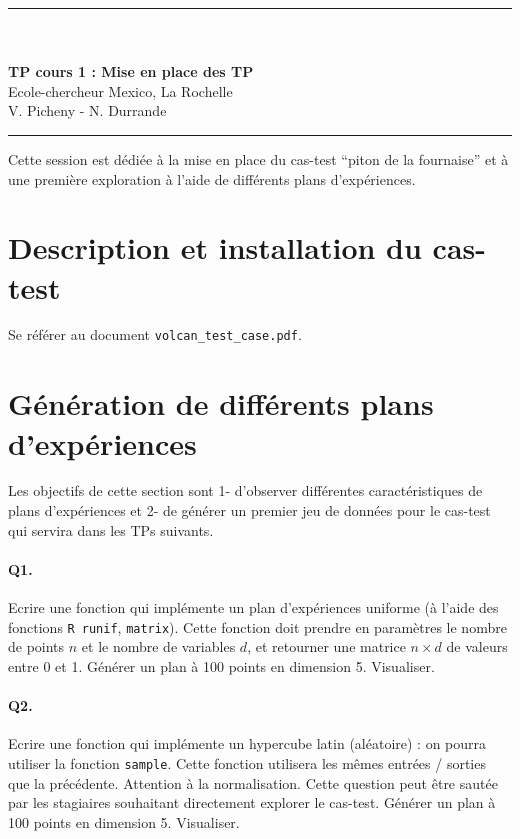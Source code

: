 \documentclass[12pt]{scrartcl}
\newcommand{\R}{\texttt{R}}
\begin{document}
\begin{center}
	\rule{\textwidth}{1pt}
	\\ \ \\
	{\LARGE \textbf{TP cours 1 : Mise en place des TP}}\\
	\vspace{3mm}
	{\large Ecole-chercheur Mexico, La Rochelle \\ \vspace{3mm}}
	{\normalsize V. Picheny - N. Durrande}\\
	\vspace{3mm}
	\rule{\textwidth}{1pt}
	\vspace{5mm}
\end{center}
Cette session est dédiée à la mise en place du cas-test ``piton de la fournaise'' et à une première exploration à l'aide de différents plans d'expériences.

\section{Description et installation du cas-test}
Se référer au document \texttt{volcan\_test\_case.pdf}.

\section{Génération de différents plans d'expériences}

Les objectifs de cette section sont 1- d'observer différentes caractéristiques de plans d'expériences et 2- de générer un premier jeu de données pour le cas-test qui servira dans les TPs suivants.

\paragraph{Q1.} Ecrire une fonction qui implémente un plan d'expériences
uniforme (à l'aide des fonctions \R \ \texttt{runif}, \texttt{matrix}). 
Cette fonction doit prendre en paramètres le nombre de points $n$ et le nombre de variables $d$, et retourner une matrice $n \times d$ de valeurs entre 0 et 1. Générer un plan à 100 points en dimension 5. Visualiser.

\paragraph{Q2.} Ecrire une fonction qui implémente un hypercube latin (aléatoire) : on pourra utiliser la fonction \texttt{sample}. Cette fonction utilisera les mêmes entrées / sorties que la précédente.
Attention à la normalisation. Cette question peut être sautée par les stagiaires souhaitant directement explorer le cas-test. Générer un plan à 100 points en dimension 5. Visualiser.
\end{document}
